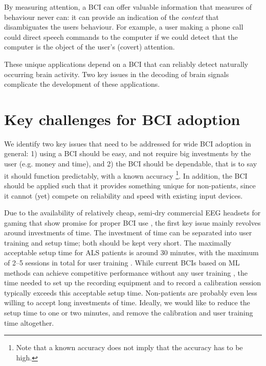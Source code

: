 By measuring attention, a \ac{BCI} can offer valuable information that measures
of behaviour never can: it can provide an indication of the \emph{context} that
disambiguates the users behaviour. For example, a user making a phone call
could direct speech commands to the computer if we could detect that the
computer is the object of the user's (covert) attention.

These unique applications depend on a \ac{BCI} that can reliably detect
naturally occurring brain activity. Two key issues in the decoding of brain
signals complicate the development of these applications.
\clearpage %

\section{Key challenges for BCI adoption}
We identify two key issues that need to be addressed for wide \ac{BCI} adoption
in general: 1) using a \ac{BCI} should be easy, and not require big
investments by the user (e.g. money and time), and 2) the \ac{BCI} should be
dependable, that is to say it should function predictably, with a known
accuracy \cite{millan2010cbc, vangerven2009bci, huggins2011wwb}\footnote{Note
that a known accuracy does not imply that the accuracy has to be high.}. In
addition, the \ac{BCI} should be applied such that it provides something unique
for non-patients, since it cannot (yet) compete on reliability and speed with
existing input devices. 

Due to the availability of relatively cheap, semi-dry commercial \ac{EEG}
headsets for gaming that show promise for proper \ac{BCI} use
\cite{bobrov2011bci}, the first key issue mainly revolves around investments of
time. The investment of time can be separated into user training and setup
time; both should be kept very short.
%
The maximally acceptable setup time for \ac{ALS} patients is around 30 minutes,
with the maximum of 2--5 sessions in total for user training
\cite{huggins2011wwb}. 
%
While current \acp{BCI} based on \ac{ML} methods can achieve competitive
performance without any user training \cite{vidal1977rtd, blankertz2006bbc},
the time needed to set up the recording equipment and to record a calibration
session typically exceeds this acceptable setup time. Non-patients are probably
even less willing to accept long investments of time. Ideally, we would like to
reduce the setup time to one or two minutes, and remove the calibration and
user training time altogether.

